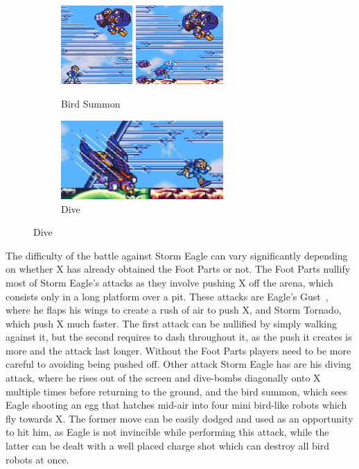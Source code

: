 \begin{figure}[htp]
	\centering
	\begin{subfigure}{\linewidth}
		\centering
		\includegraphics[height=3cm]{figures/X1/Storm_eagle/Eagle_egg_1.jpg}
		\includegraphics[height=3cm]{figures/X1/Storm_eagle/Eagle_egg_2.jpg}
		\caption{Bird Summon}
	\end{subfigure}
	\begin{subfigure}{\linewidth}
		\centering
		\includegraphics[height=3cm]{figures/X1/Storm_eagle/Eagle_dive.jpg}
		\caption{Dive}
	\end{subfigure}
\end{figure}
The difficulty of the battle against Storm Eagle can vary significantly depending on whether X has already obtained the Foot Parts or not. The Foot Parts nullify most of Storm Eagle's attacks as they involve pushing X off the arena, which consists only in a long platform over a pit. These attacks are Eagle's Gust~\cite{wiki:Storm_eagle}, where he flaps his wings to create a rush of air to push X, and Storm Tornado, which push X much faster. The first attack can be nullified by simply walking against it, but the second requires to dash throughout it, as the push it creates is more and the attack last longer. Without the Foot Parts players need to be more careful to avoiding being pushed off. Other attack Storm Eagle has are his diving attack, where he rises out of the screen and dive-bombs diagonally onto X multiple times before returning to the ground, and the bird summon, which sees Eagle shooting an egg that hatches mid-air into four mini bird-like robots which fly towards X. The former move can be easily dodged and used as an opportunity to hit him, as Eagle is not invincible while performing this attack, while the latter can be dealt with a well placed charge shot which can destroy all bird robots at once.



